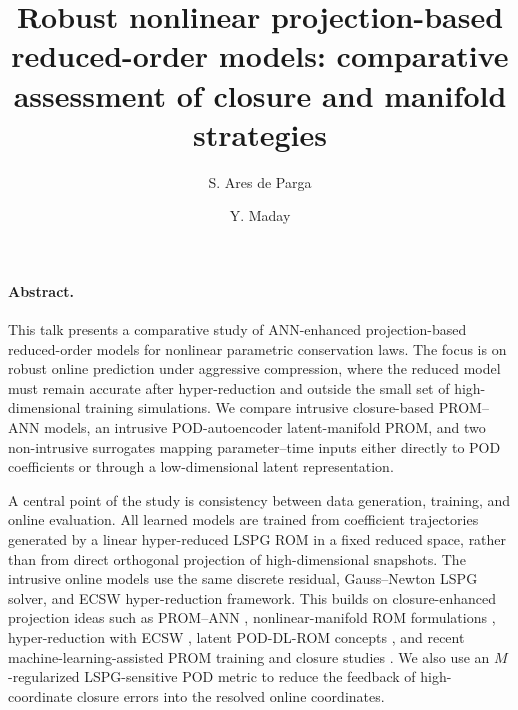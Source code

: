 \documentclass[a4paper,11pt]{article}
\date{}
\begin{document}
\title{Robust nonlinear projection-based reduced-order models: comparative assessment of closure and manifold strategies}

\author[1]{S. Ares de Parga}
\author[2]{Y. Maday}


\maketitle
\thispagestyle{empty}
\vspace{-0.7cm}

\paragraph{Abstract.}
This talk presents a comparative study of ANN-enhanced projection-based reduced-order models for nonlinear parametric conservation laws.  The focus is on robust online prediction under aggressive compression, where the reduced model must remain accurate after hyper-reduction and outside the small set of high-dimensional training simulations.  We compare intrusive closure-based PROM--ANN models, an intrusive POD-autoencoder latent-manifold PROM, and two non-intrusive surrogates mapping parameter--time inputs either directly to POD coefficients or through a low-dimensional latent representation.

A central point of the study is consistency between data generation, training, and online evaluation.  All learned models are trained from coefficient trajectories generated by a linear hyper-reduced LSPG ROM in a fixed reduced space, rather than from direct orthogonal projection of high-dimensional snapshots.  The intrusive online models use the same discrete residual, Gauss--Newton LSPG solver, and ECSW hyper-reduction framework.  This builds on closure-enhanced projection ideas such as PROM--ANN \cite{barnett2023neural}, nonlinear-manifold ROM formulations \cite{aghili2026nonlinear}, hyper-reduction with ECSW \cite{grimberg2021mesh}, latent POD-DL-ROM concepts \cite{fresca2022pod}, and recent machine-learning-assisted PROM training and closure studies \cite{sibuet2025discrete,aresdeparga2026regression}.  We also use an $M$-regularized LSPG-sensitive POD metric to reduce the feedback of high-coordinate closure errors into the resolved online coordinates.
\end{document}
